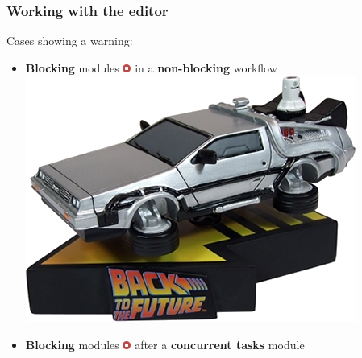 \begin{frame}
    \frametitle{Working with the editor}
    Cases showing a warning:
    \begin{itemize}
        \item \textbf{Blocking} modules \includegraphics[width=10px]{pictures/blocking-module.png} in a \textbf{non-blocking} workflow \includegraphics[width=0.12\linewidth]{pictures/time-machine.png}
        \item \textbf{Blocking} modules \includegraphics[width=10px]{pictures/blocking-module.png} after a \textbf{concurrent tasks} module
        \begin{center}
        \end{center}
    \end{itemize}
\end{frame}

